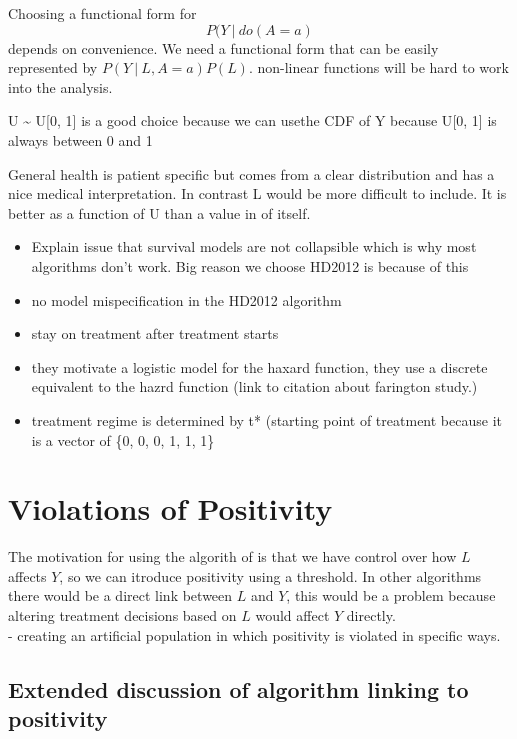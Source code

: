 \documentclass[11pt]{article}
\providecommand{\tightlist}{%
      \setlength{\itemsep}{0pt}\setlength{\parskip}{0pt}}
\begin{document}
Choosing a functional form for \[P(Y\ |\ do(A=a)\] depends on
convenience. We need a functional form that can be easily represented by
\(P(Y\ |\ L, A=a)P(L)\). non-linear functions will be hard to work into
the analysis.

U \textasciitilde{} U{[}0, 1{]} is a good choice because we can usethe
CDF of Y because U{[}0, 1{]} is always between 0 and 1

General health is patient specific but comes from a clear distribution
and has a nice medical interpretation. In contrast L would be more
difficult to include. It is better as a function of U than a value in of
itself.

\begin{itemize}
\tightlist
\item
  Explain issue that survival models are not collapsible which is why
  most algorithms don't work. Big reason we choose HD2012 is because of
  this
\item
  no model mispecification in the HD2012 algorithm
\item
  stay on treatment after treatment starts
\item
  they motivate a logistic model for the haxard function, they use a
  discrete equivalent to the hazrd function (link to citation about
  farington study.)
\item
  treatment regime is determined by t* (starting point of treatment
  because it is a vector of \{0, 0, 0, 1, 1, 1\}
\end{itemize}

    \section{Violations of Positivity}\label{violations-of-positivity}

The motivation for using the algorith of \citet{Havercroft2012} is that
we have control over how \(L\) affects \(Y\), so we can itroduce
positivity using a threshold. In other algorithms there would be a
direct link between \(L\) and \(Y\), this would be a problem because
altering treatment decisions based on \(L\) would affect \(Y\)
directly.\\
- creating an artificial population in which positivity is violated in
specific ways.

\subsection{Extended discussion of algorithm linking to
positivity}\label{extended-discussion-of-algorithm-linking-to-positivity}
\end{document}
